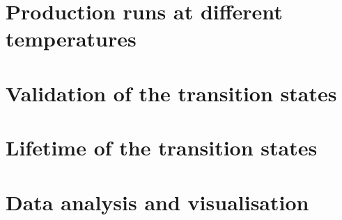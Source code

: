 \section{Production runs at different temperatures}


\section{Validation of the transition states}


\section{Lifetime of the transition states}


\section{Data analysis and visualisation}